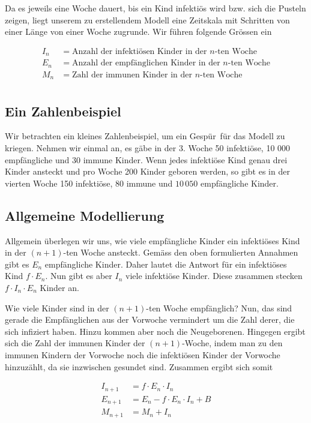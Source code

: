 \documentclass[%
11pt,%
twoside,%
titlepage,%
german,%
headsepline%
]{scrartcl}
\begin{document}
Da es jeweils eine Woche dauert, bis ein Kind infektiös wird bzw. sich die Pusteln zeigen, liegt unserem zu erstellendem Modell eine Zeitskala mit Schritten von einer Länge von einer Woche zugrunde. Wir führen folgende Grössen ein

\begin{align*}
I_n &= \text{Anzahl der infektiösen Kinder in der $n$-ten Woche}\\
E_n &= \text{Anzahl der empfänglichen Kinder in der $n$-ten Woche}\\
M_n &= \text{Zahl der immunen Kinder in der $n$-ten Woche}\\
\end{align*}

\subsection*{Ein Zahlenbeispiel}

Wir betrachten ein kleines Zahlenbeispiel, um ein \glqq Gespür\grqq\ für das Modell zu kriegen. Nehmen wir einmal an, es gäbe in der 3. Woche 50 infektiöse, 10 000 empfängliche und 30 immune Kinder. Wenn jedes infektiöse Kind genau drei Kinder ansteckt und pro Woche 200 Kinder geboren werden, so gibt es in der vierten Woche 150 infektiöse, 80 immune und $10\,050$ empfängliche Kinder.

\subsection{Allgemeine Modellierung}

Allgemein überlegen wir uns, wie viele empfängliche Kinder ein infektiöses Kind in der $(n+ 1)$-ten Woche ansteckt. Gemäss den oben formulierten Annahmen gibt es $E_n$ empfängliche Kinder. Daher lautet die Antwort für ein infektiöses Kind $f\cdot E_n$. Nun gibt es aber $I_n$ viele infektiöse Kinder. Diese zusammen stecken $f\cdot I_n\cdot E_n$ Kinder an.

Wie viele Kinder sind in der $(n+1)$-ten Woche empfänglich? Nun, das sind gerade die Empfänglichen aus der Vorwoche vermindert um die Zahl derer, die sich infiziert haben. Hinzu kommen aber noch die Neugeborenen. Hingegen ergibt sich die Zahl der immunen Kinder der $(n+1)$-Woche, indem man zu den immunen Kindern der Vorwoche noch die infektiösen Kinder der Vorwoche hinzuzählt, da sie inzwischen gesundet sind. Zusammen ergibt sich somit

\begin{align*}
I_{n+1} &= f\cdot E_n\cdot I_n\\
E_{n+1} &= E_n-f\cdot E_n\cdot I_n+B\\
M_{n+1} &= M_n+I_n
\end{align*}
\end{document}
